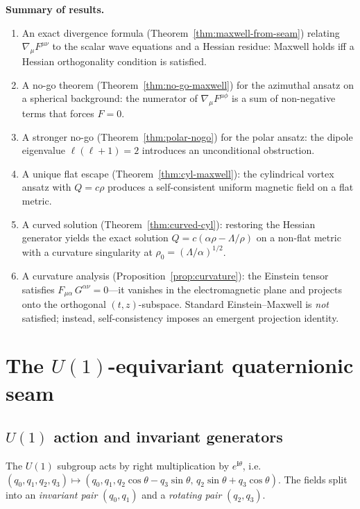 \documentclass[pdflatex,sn-mathphys-num]{sn-jnl}
\theoremstyle{thmstyleone}%
\theoremstyle{thmstyletwo}%
\theoremstyle{thmstylethree}%
\newcommand{\nn}{\nabla}
\numberwithin{equation}{section}
\begin{document}
\medskip\noindent
\textbf{Summary of results.}
\begin{enumerate}[noitemsep]
\item An exact divergence formula
  (Theorem~\ref{thm:maxwell-from-seam}) relating
  $\nn_\mu F^{\mu\nu}$ to the scalar wave equations and a
  Hessian residue: Maxwell holds iff a Hessian orthogonality
  condition is satisfied.
\item A no-go theorem (Theorem~\ref{thm:no-go-maxwell}) for the
  azimuthal ansatz on a spherical background: the numerator of
  $\nn_\mu F^{\mu\phi}$ is a sum of non-negative terms that
  forces $F = 0$.
\item A stronger no-go (Theorem~\ref{thm:polar-nogo}) for the
  polar ansatz: the dipole eigenvalue $\ell(\ell+1) = 2$
  introduces an unconditional obstruction.
\item A unique flat escape (Theorem~\ref{thm:cyl-maxwell}): the
  cylindrical vortex ansatz with $Q = c\rho$ produces a
  self-consistent uniform magnetic field on a flat metric.
\item A curved solution (Theorem~\ref{thm:curved-cyl}): restoring
  the Hessian generator yields the exact solution
  $Q = c(\alpha\rho - \Lambda/\rho)$ on a non-flat metric with
  a curvature singularity at $\rho_0 = (\Lambda/\alpha)^{1/2}$.
\item A curvature analysis (Proposition~\ref{prop:curvature}):
  the Einstein tensor satisfies
  $F_{\mu\alpha}\,G^{\alpha\nu} = 0$---it vanishes in the
  electromagnetic plane and projects onto the orthogonal
  $(t,z)$-subspace.  Standard Einstein--Maxwell is
  \emph{not} satisfied; instead, self-consistency imposes an
  emergent projection identity.
\end{enumerate}

\section{The \texorpdfstring{$U(1)$}{U(1)}-equivariant quaternionic seam}
\label{sec:u1-seam}

\subsection{\texorpdfstring{$U(1)$}{U(1)} action and invariant generators}

The $U(1)$ subgroup acts by right multiplication by
$e^{\mathbf{i}\theta}$, i.e.\
$(q_0,q_1,q_2,q_3)\mapsto (q_0,q_1,
  q_2\cos\theta - q_3\sin\theta,\,
  q_2\sin\theta + q_3\cos\theta)$.
The fields split into an \emph{invariant pair} $(q_0,q_1)$ and a
\emph{rotating pair} $(q_2,q_3)$.
\end{document}
